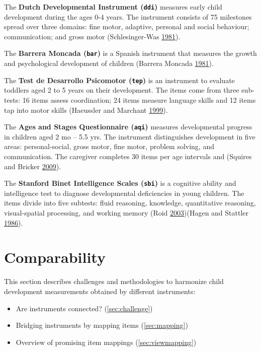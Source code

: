 \documentclass[
]{book}
\providecommand{\tightlist}{%
  \setlength{\itemsep}{0pt}\setlength{\parskip}{0pt}}
\begin{document}
The \textbf{Dutch Developmental Instrument (\texttt{ddi})} measures early child development during the ages 0-4 years. The instrument consists of 75 milestones spread over three domains: fine motor, adaptive, personal and social behaviour; communication; and gross motor (Schlesinger-Was \protect\hyperlink{ref-schlesinger1981}{1981}).

The \textbf{Barrera Moncada (\texttt{bar})} is a Spanish instrument that measures the growth and psychological development of children (Barrera Moncada \protect\hyperlink{ref-barrera1981}{1981}).

The \textbf{Test de Desarrollo Psicomotor (\texttt{tep})} is an instrument to evaluate toddlers aged 2 to 5 years on their development. The items come from three sub-tests: 16 items assess coordination; 24 items measure language skills and 12 items tap into motor skills (Haeussler and Marchant \protect\hyperlink{ref-haeussler1999}{1999}).

The \textbf{Ages and Stages Questionnaire (\texttt{aqi})} measures developmental progress in children aged 2 mo -- 5.5 yrs. The instrument distinguishes development in five areas: personal-social, gross motor, fine motor, problem solving, and communication. The caregiver completes 30 items per age intervals and (Squires and Bricker \protect\hyperlink{ref-squires2009}{2009}).

The \textbf{Stanford Binet Intelligence Scales (\texttt{sbi})} is a cognitive ability and intelligence test to diagnose developmental deficiencies in young children. The items divide into five subtests: fluid reasoning, knowledge, quantitative reasoning, visual-spatial processing, and working memory (Roid \protect\hyperlink{ref-roid2003}{2003})(Hagen and Stattler \protect\hyperlink{ref-hagen1986}{1986}).

\hypertarget{ch:comparability}{%
\chapter{Comparability}\label{ch:comparability}}

This section describes challenges and methodologies to harmonize child development measurements obtained by different instruments:

\begin{itemize}
\tightlist
\item
  Are instruments connected? (\ref{sec:challenge})
\item
  Bridging instruments by mapping items (\ref{sec:mapping})
\item
  Overview of promising item mappings (\ref{sec:viewmapping})
\end{itemize}
\end{document}
